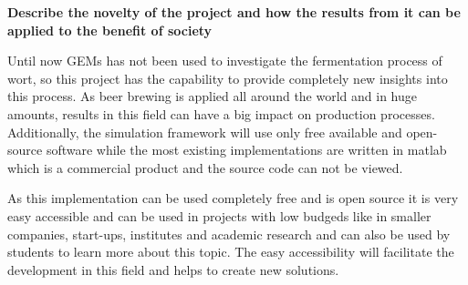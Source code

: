 
\noindent
\textbf{Describe the novelty of the project and how the results from it can be applied to the benefit of society}

Until now GEMs has not been used to investigate the fermentation process of wort, so this project has the capability to provide completely
new insights into this process. As beer brewing is applied all around the world and in huge amounts, results in this field can have a big
impact on production processes.
Additionally, the simulation framework will use only free available and open-source software while the most existing implementations are written in matlab
which is a commercial product and the source code can not be viewed.


As this implementation can be used completely free and is open source it is very easy accessible and can be used in projects with low budgeds
like in smaller companies, start-ups, institutes and academic research and can also be used by students to learn more about this topic.
The easy accessibility will facilitate the development in this field and helps to create new solutions.


